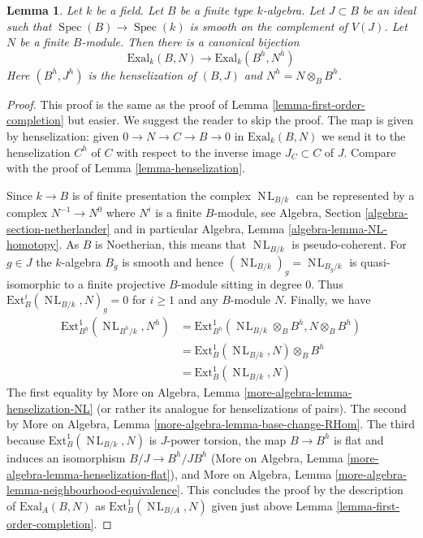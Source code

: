 \documentclass{stacks-project}
\theoremstyle{plain}
\newtheorem{lemma}[subsection]{Lemma}
\theoremstyle{definition}
\theoremstyle{remark}
\numberwithin{equation}{subsection}
\def\Spec{\mathop{\mathrm{Spec}}}
\def\NL{\mathop{N\!L}\nolimits}
\begin{document}
\begin{lemma}
\label{lemma-first-order-henselization}
Let $k$ be a field. Let $B$ be a finite type $k$-algebra.
Let $J \subset B$ be an ideal such that
$\Spec(B) \to \Spec(k)$ is smooth on the complement of $V(J)$.
Let $N$ be a finite $B$-module.
Then there is a canonical bijection
$$
\text{Exal}_k(B, N) \to \text{Exal}_k(B^h, N^h)
$$
Here $(B^h, J^h)$ is the henselization of $(B, J)$
and $N^h = N \otimes_B B^h$.
\end{lemma}

\begin{proof}
This proof is the same as the proof of
Lemma \ref{lemma-first-order-completion} but easier. We suggest the
reader to skip the proof.
The map is given by henselization: given $0 \to N \to C \to B \to 0$
in $\text{Exal}_k(B, N)$ we send it to the
henselization $C^h$
of $C$ with respect to the inverse image $J_C \subset C$ of $J$.
Compare with the proof of Lemma \ref{lemma-henselization}.

\medskip\noindent
Since $k \to B$ is of finite presentation the complex
$\NL_{B/k}$ can be represented by a complex
$N^{-1} \to N^0$ where $N^i$ is a finite $B$-module, see
Algebra, Section \ref{algebra-section-netherlander} and
in particular
Algebra, Lemma \ref{algebra-lemma-NL-homotopy}.
As $B$ is Noetherian, this means that $\NL_{B/k}$
is pseudo-coherent. For $g \in J$ the $k$-algebra $B_g$
is smooth and hence $(\NL_{B/k})_g = \NL_{B_g/k}$
is quasi-isomorphic to a finite projective $B$-module sitting in degree $0$.
Thus $\text{Ext}^i_B(\NL_{B/k}, N)_g = 0$ for $i \geq 1$
and any $B$-module $N$. Finally, we have
\begin{align*}
\text{Ext}^1_{B^h}(\NL_{B^h/k}, N^h)
& =
\text{Ext}^1_{B^h}(\NL_{B/k} \otimes_B B^h, N \otimes_B B^h) \\
& =
\text{Ext}^1_B(\NL_{B/k}, N) \otimes_B B^h \\
& =
\text{Ext}^1_B(\NL_{B/k}, N)
\end{align*}
The first equality by
More on Algebra, Lemma \ref{more-algebra-lemma-henselization-NL}
(or rather its analogue for henselizations of pairs).
The second by
More on Algebra, Lemma \ref{more-algebra-lemma-base-change-RHom}.
The third because $\text{Ext}^1_B(\NL_{B/k}, N)$ is $J$-power
torsion, the map $B \to B^h$ is flat and induces an isomorphism
$B/J \to B^h/JB^h$ (More on Algebra, Lemma
\ref{more-algebra-lemma-henselization-flat}), and
More on Algebra, Lemma \ref{more-algebra-lemma-neighbourhood-equivalence}.
This concludes the proof by the description of $\text{Exal}_A(B, N)$
as $\text{Ext}^1_B(\NL_{B/A}, N)$ given just above
Lemma \ref{lemma-first-order-completion}.
\end{proof}
\end{document}
